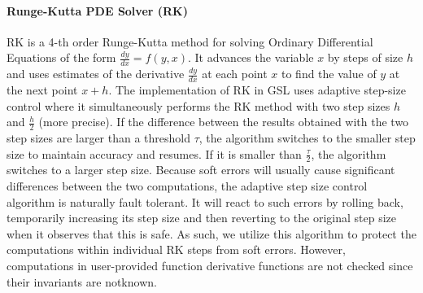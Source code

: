 \documentclass{sig-alternate}
\begin{document}
\vspace{-5pt}
\paragraph{Runge-Kutta PDE Solver (RK)}
RK is a 4-th order Runge-Kutta method for solving Ordinary Differential Equations of the form $\frac{dy}{dx} = f(y, x)$.
It advances the variable $x$ by steps of size $h$ and uses estimates of the derivative $\frac{dy}{dx}$ at each point $x$ to find the value of $y$ at the next point $x+h$.
The implementation of RK in GSL uses adaptive step-size control where it simultaneously performs the RK method with two step sizes $h$ and $\frac{h}{2}$ (more precise).
If the difference between the results obtained with the two step sizes are larger than a threshold $\tau$, the algorithm switches to the smaller step size to maintain accuracy and resumes.
If it is smaller than $\frac{\tau}{2}$, the algorithm switches to a larger step size.
Because soft errors will usually cause significant differences between the two computations, the adaptive step size control algorithm is naturally fault tolerant.
It will react to such errors by rolling back, temporarily increasing its step size and then reverting to the original step size when it observes that this is safe.
As such, we utilize this algorithm to protect the computations within individual RK steps from soft errors.
However, computations in user-provided function derivative functions are not checked since their invariants are notknown.

\end{document}
